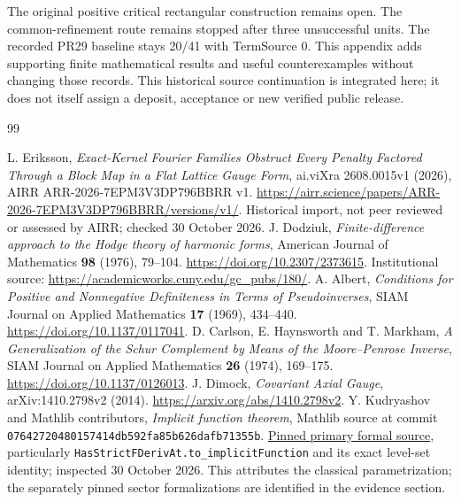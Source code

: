 \documentclass[11pt]{article}
\begin{document}
The original positive critical rectangular construction remains open.
The common-refinement route remains stopped after three unsuccessful units.
The recorded PR29 baseline stays 20/41 with TermSource 0. This appendix adds
supporting finite mathematical results and useful counterexamples without
changing those records. This historical source continuation is integrated here; it does not itself assign a deposit,
acceptance or new verified public release.










\begin{thebibliography}{99}
\small
\raggedright
{} L. Eriksson, \emph{Exact-Kernel Fourier Families Obstruct
Every Penalty Factored Through a Block Map in a Flat Lattice Gauge Form},
ai.viXra 2608.0015v1 (2026), AIRR ARR-2026-7EPM3V3DP796BBRR v1.
\url{https://airr.science/papers/ARR-2026-7EPM3V3DP796BBRR/versions/v1/}.
Historical import, not peer reviewed or assessed by AIRR; checked 30 October 2026.
 J. Dodziuk, \emph{Finite-difference approach to the Hodge
theory of harmonic forms}, American Journal of Mathematics \textbf{98}
(1976), 79--104. \url{https://doi.org/10.2307/2373615}.
Institutional source: \url{https://academicworks.cuny.edu/gc_pubs/180/}.
 A. Albert, \emph{Conditions for Positive and Nonnegative
Definiteness in Terms of Pseudoinverses}, SIAM Journal on Applied Mathematics
\textbf{17} (1969), 434--440. \url{https://doi.org/10.1137/0117041}.
 D. Carlson, E. Haynsworth and T. Markham,
\emph{A Generalization of the Schur Complement by Means of the Moore--Penrose
Inverse}, SIAM Journal on Applied Mathematics \textbf{26} (1974), 169--175.
\url{https://doi.org/10.1137/0126013}.
 J. Dimock, \emph{Covariant Axial Gauge},
arXiv:1410.2798v2 (2014). \url{https://arxiv.org/abs/1410.2798v2}.
 Y. Kudryashov and Mathlib contributors,
\emph{Implicit function theorem}, Mathlib source at commit
\texttt{07642720480157414db592fa85b626dafb71355b}.
\href{https://github.com/leanprover-community/mathlib4/blob/07642720480157414db592fa85b626dafb71355b/Mathlib/Analysis/Calculus/Implicit.lean}{Pinned primary formal source},
particularly \texttt{HasStrictFDerivAt.to\_implicitFunction} and its exact
level-set identity; inspected 30 October 2026. This attributes the classical parametrization; the separately pinned sector formalizations are identified in the evidence section.

\end{thebibliography}
\end{document}
